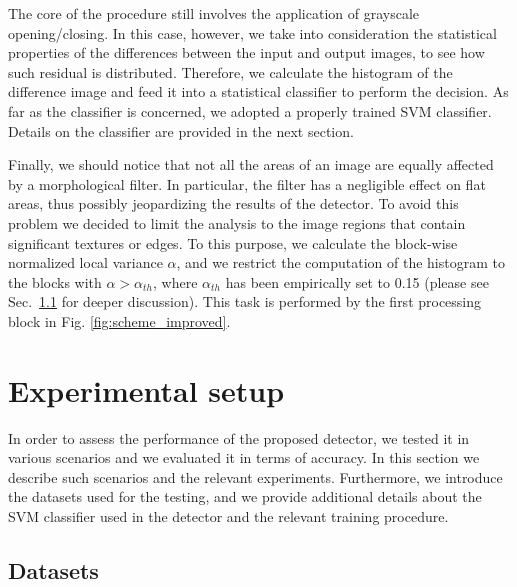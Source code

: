 \documentclass[review]{elsarticle}
\begin{document}
The core of the procedure still involves the application of grayscale opening/closing. In this case, however, we take into consideration the statistical properties of the differences between the input and output images, to see how such residual is distributed. Therefore, we calculate the histogram of the difference image and feed it into a statistical classifier to perform the decision. As far as the classifier is concerned, we adopted a properly trained SVM classifier. Details on the classifier are provided in the next section.

Finally, we should notice that not all the areas of an image are equally affected by a morphological filter. In particular, the filter has a negligible effect on flat areas, thus possibly jeopardizing the results of the detector. To avoid this problem we decided to limit the analysis to the image regions that contain significant textures or edges. To this purpose, we calculate the block-wise normalized local variance $\alpha$, and we restrict the computation of the histogram to the blocks with $\alpha > \alpha_{th}$, where $\alpha_{th}$ has been empirically set to 0.15 (please see Sec.~\ref{} for deeper discussion). This task is performed by the first processing block in Fig. \ref{fig:scheme_improved}. 


\section{Experimental setup}

In order to assess the performance of the proposed detector, we tested it in various scenarios and we evaluated it in terms of accuracy. In this section we describe such scenarios and the relevant experiments. Furthermore, we introduce the datasets used for the testing, and we provide additional details about the SVM classifier used in the detector and the relevant training procedure.

\subsection{Datasets}
\end{document}

